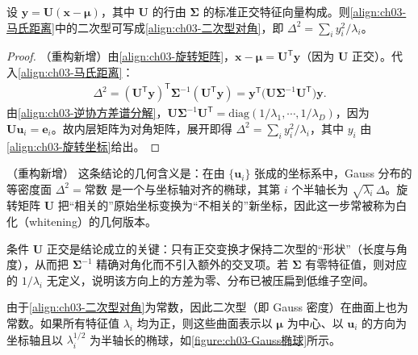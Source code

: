 \documentclass[../../main.tex]{subfiles}
\begin{document}
\begin{proposition}[二次型的对角化]\label{proposition:ch03-二次型对角化}
设 $\boldsymbol{y}=\boldsymbol{U}(\boldsymbol{x}-\boldsymbol{\mu})$，其中 $\boldsymbol{U}$ 的行由 $\boldsymbol{\Sigma}$ 的标准正交特征向量构成。则\eqref{align:ch03-马氏距离}中的二次型可写成\eqref{align:ch03-二次型对角}，即 $\Delta^{2}=\sum_{i}y_i^{2}/\lambda_i$。
\end{proposition}
\begin{proof}
（重构新增）由\eqref{align:ch03-旋转矩阵}，$\boldsymbol{x}-\boldsymbol{\mu}=\boldsymbol{U}^{\mathsf{T}}\boldsymbol{y}$（因为 $\boldsymbol{U}$ 正交）。代入\eqref{align:ch03-马氏距离}：
\begin{align*}
\Delta^{2}=(\boldsymbol{U}^{\mathsf{T}}\boldsymbol{y})^{\mathsf{T}}\boldsymbol{\Sigma}^{-1}(\boldsymbol{U}^{\mathsf{T}}\boldsymbol{y})=\boldsymbol{y}^{\mathsf{T}}\bigl(\boldsymbol{U}\boldsymbol{\Sigma}^{-1}\boldsymbol{U}^{\mathsf{T}}\bigr)\boldsymbol{y}.
\end{align*}
由\eqref{align:ch03-逆协方差谱分解}，$\boldsymbol{U}\boldsymbol{\Sigma}^{-1}\boldsymbol{U}^{\mathsf{T}}=\mathrm{diag}(1/\lambda_1,\cdots,1/\lambda_D)$，因为 $\boldsymbol{U}\boldsymbol{u}_i=\boldsymbol{e}_i$。故内层矩阵为对角矩阵，展开即得 $\Delta^{2}=\sum_i y_i^{2}/\lambda_i$，其中 $y_i$ 由\eqref{align:ch03-旋转坐标}给出。
\end{proof}

\begin{remark}（重构新增）
这条结论的几何含义是：在由 $\{\boldsymbol{u}_i\}$ 张成的坐标系中，Gauss 分布的等密度面 $\Delta^{2}=\text{常数}$ 是一个与坐标轴对齐的椭球，其第 $i$ 个半轴长为 $\sqrt{\lambda_i}\,\Delta$。旋转矩阵 $\boldsymbol{U}$ 把“相关的”原始坐标变换为“不相关的”新坐标，因此这一步常被称为白化（whitening）的几何版本。

条件 $\boldsymbol{U}$ 正交是结论成立的关键：只有正交变换才保持二次型的“形状”（长度与角度），从而把 $\boldsymbol{\Sigma}^{-1}$ 精确对角化而不引入额外的交叉项。若 $\boldsymbol{\Sigma}$ 有零特征值，则对应的 $1/\lambda_i$ 无定义，说明该方向上的方差为零、分布已被压扁到低维子空间。
\end{remark}

由于\eqref{align:ch03-二次型对角}为常数，因此二次型（即 Gauss 密度）在曲面上也为常数。如果所有特征值 $\lambda_i$ 均为正，则这些曲面表示以 $\boldsymbol{\mu}$ 为中心、以 $\boldsymbol{u}_{i}$ 的方向为坐标轴且以 $\lambda_i^{1/2}$ 为半轴长的椭球，如\cref{figure:ch03-Gauss椭球}所示。
\end{document}
